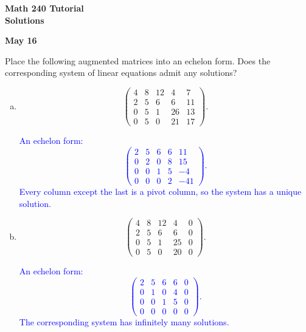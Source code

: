 \documentclass[a4paper,11pt]{article}
\newcommand{\BB}[1]{\textcolor{blue}{#1}}
\begin{document}
\begin{center}
  {\Large\bfseries Math 240 Tutorial \\ Solutions}
\end{center}
\begin{center}
  {\bfseries May 16}
\end{center}

 Place the following augmented matrices into
an echelon form. Does the corresponding system of linear equations admit any
solutions?
\begin{enumerate}[(a)]
\item
  \[
    \left(
      \begin{array}{cccc|c}
        4 & 8 & 12 & 4 & 7 \\
        2 & 5 & 6 & 6 & 11 \\
        0 & 5 & 1 & 26 & 13 \\
        0 & 5 & 0 & 21 & 17
      \end{array}
    \right).
  \]

  \BB{
    An echelon form:
    \[
      \left(
        \begin{array}{cccc|c}
          2 & 5 & 6 & 6 & 11 \\
          0 & 2 & 0 & 8 & 15 \\
          0 & 0 & 1 & 5 & -4 \\
          0 & 0 & 0 & 2 & -41
        \end{array}
      \right).
    \]
    Every column except the last is a pivot column, so the system has a unique
    solution.  \\
  }

\item
  \[
    \left(
      \begin{array}{cccc|c}
        4 & 8 & 12 & 4 & 0 \\
        2 & 5 & 6 & 6 & 0 \\
        0 & 5 & 1 & 25 & 0 \\
        0 & 5 & 0 & 20 & 0       
      \end{array}
    \right).
  \]

  \BB{
    An echelon form:
    \[
      \left(
        \begin{array}{cccc|c}
          2 & 5 & 6 & 6 & 0 \\
          0 & 1 & 0 & 4 & 0 \\
          0 & 0 & 1 & 5 & 0 \\
          0 & 0 & 0 & 0 & 0
        \end{array}
      \right).
    \]
    The corresponding system has infinitely many solutions. \\
  }


\end{enumerate}
\end{document}
